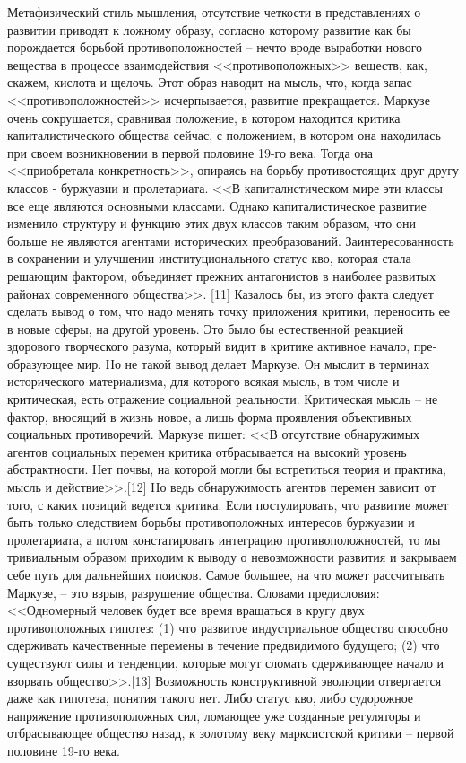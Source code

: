 \documentclass{book}
\begin{document}
{Метафизический стиль мышления, отсутствие четкости в представлениях о развитии приводят к ложному образу, со­гласно которому развитие как бы порождается борьбой про­тивоположностей -- нечто вроде выработки нового вещества в процессе взаимодействия <<противоположных>> веществ, как, скажем, кислота и щелочь. Этот образ наводит на мысль, что, когда запас <<противоположностей>> исчерпывается, развитие прекращается. Маркузе очень сокрушается, сравнивая поло­жение, в котором находится критика капиталистического об­щества сейчас, с положением, в котором она находилась при своем возникновении в первой половине 19-го века. Тогда она <<приобретала конкретность>>, опираясь на борьбу противо­стоящих друг другу классов - буржуазии и пролетариата. <<В капиталистическом мире эти классы все еще являются основ­ными классами. Однако капиталистическое развитие измени­ло структуру и функцию этих двух классов таким образом, что они больше не являются агентами исторических преобра­зований. Заинтересованность в сохранении и улучшении 
инсти­туционального статус кво, которая стала решающим фактором, объединяет прежних антагонистов в наиболее развитых рай­онах современного общества>>. [11] Казалось бы, из этого фак­та следует сделать вывод о том, что надо менять точку прило­жения критики, переносить ее в новые сферы, на другой уро­вень. Это было бы естественной реакцией здорового творче­ского разума, который видит в критике активное начало, пре­образующее мир. Но не такой вывод делает Маркузе. Он мыслит в терминах исторического материализма, для которого всякая мысль, в том числе и критическая, есть отражение социальной реальности. Критическая мысль -- не фактор, вносящий в жизнь новое, а лишь форма проявления объективных социальных противоречий. Маркузе пишет: <<В отсутствие обнаружимых агентов социальных перемен критика отбрасывается на высо­кий уровень абстрактности. Нет почвы, на которой могли бы встретиться теория и практика, мысль и действие>>.[12] Но ведь обнаружимость агентов перемен зависит от того, с каких пози­ций ведется критика. 
Если постулировать, что развитие может быть только следствием борьбы противоположных интересов буржуазии и пролетариата, а потом констатировать интегра­цию противоположностей, то мы тривиальным образом при­ходим к выводу о невозможности развития и закрываем себе путь для дальнейших поисков. Самое большее, на что может рассчитывать Маркузе, -- это взрыв, разрушение общества. Словами предисловия: <<Одномерный человек  будет все время вращаться в кругу двух противоположных гипотез: (1) что развитое индустриальное общество способно сдерживать ка­чественные перемены в течение предвидимого будущего; (2) что существуют силы и тенденции, которые могут сломать сдерживающее начало и взорвать общество>>.[13] Возможность конструктивной эволюции отвергается даже как гипотеза, по­нятия такого нет. Либо статус кво, либо судорожное напряже­ние противоположных сил, ломающее уже созданные регуля­торы и отбрасывающее общество назад, к золотому веку марк­систской критики -- первой половине 19-го века.

}
\end{document}

